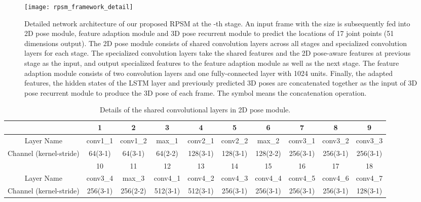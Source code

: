 \documentclass[10pt,twocolumn,letterpaper]{article}
\begin{document}
\begin{figure*}[ht]
	\centering
	\texttt{[image: rpsm\_framework\_detail]}
	\vspace{-10pt}
	\caption{Detailed network architecture of our proposed RPSM at the -th stage. An input frame with the  size is subsequently fed into 2D pose module, feature adaption module and 3D pose recurrent module to predict the locations of 17 joint points (51 dimensions output). The 2D pose module consists of  shared convolution layers across all stages and  specialized convolution layers for each stage. The specialized convolution layers take the shared features and the 2D pose-aware features at previous stage as the input, and output specialized features to the feature adaption module as well as the next stage. The feature adaption module consists of two convolution layers and one fully-connected layer with 1024 units. Finally, the adapted features, the hidden states of the LSTM layer and previously predicted 3D poses are concatenated together as the input of 3D pose recurrent module to produce the 3D pose of each frame. The symbol  means the concatenation operation.}
	\label{fig:stage_detail}
	\vspace{-10pt}
\end{figure*}

\begin{table*}
\label{fig:2D_network_shared}
\begin{adjustbox}{max width=1.0\textwidth}
\begin{tabular}{|c|c|c|c|c|c|c|c|c|c|}
\hline
 & 1 & 2 & 3 & 4 & 5 & 6 & 7 & 8 & 9 \\ \hline
Layer Name & conv1\_1 & conv1\_2 & max\_1 & conv2\_1 & conv2\_2 & max\_2 & conv3\_1 & conv3\_2 & conv3\_3 \\ \hline
Channel (kernel-stride) & 64(3-1) & 64(3-1) & 64(2-2) & 128(3-1) & 128(3-1) & 128(2-2) & 256(3-1) & 256(3-1) & 256(3-1) \\ \hline
 & 10 & 11 & 12 & 13 & 14 & 15 & 16 & 17 & 18 \\ \hline
Layer Name & conv3\_4 & max\_3 & conv4\_1 & conv4\_2 & conv4\_3 & conv4\_4 & conv4\_5 & conv4\_6 & conv4\_7 \\ \hline
Channel (kernel-stride) & 256(3-1) & 256(2-2) & 512(3-1) & 512(3-1) & 256(3-1) & 256(3-1) & 256(3-1) & 256(3-1) & 128(3-1) \\ \hline
\end{tabular}
\end{adjustbox}
\vspace{-10pt}
\caption{Details of the shared convolutional layers in 2D pose module. }
\label{table:shared_network_details}
\vspace{-10pt}
\end{table*}
\end{document}
